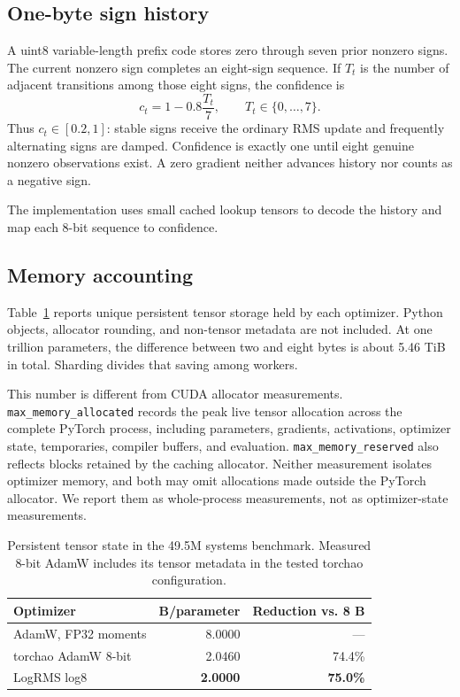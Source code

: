 \documentclass[10pt,twocolumn]{article}
\begin{document}
\subsection{One-byte sign history}

A uint8 variable-length prefix code stores zero through seven prior nonzero
signs. The current nonzero sign completes an eight-sign sequence. If $T_t$ is
the number of adjacent transitions among those eight signs, the confidence is
\begin{equation}
c_t = 1 - 0.8\frac{T_t}{7}, \qquad T_t\in\{0,\ldots,7\}.
\end{equation}
Thus $c_t\in[0.2,1]$: stable signs receive the ordinary RMS update and frequently
alternating signs are damped. Confidence is exactly one until eight genuine
nonzero observations exist. A zero gradient neither advances history nor counts
as a negative sign.

The implementation uses small cached lookup tensors to decode the history and
map each 8-bit sequence to confidence.

\subsection{Memory accounting}

Table~\ref{tab:payload} reports unique persistent tensor storage held by each
optimizer. Python objects, allocator rounding, and non-tensor metadata are not
included. At one trillion parameters, the difference between two and eight
bytes is about 5.46 TiB in total. Sharding divides that saving among workers.

This number is different from CUDA allocator measurements.
\texttt{max\_memory\_allocated} records the peak live tensor allocation across
the complete PyTorch process, including parameters, gradients, activations,
optimizer state, temporaries, compiler buffers, and evaluation.
\texttt{max\_memory\_reserved} also reflects blocks retained by the
caching allocator. Neither measurement isolates optimizer memory, and both may
omit allocations made outside the PyTorch allocator. We report them as
whole-process measurements, not as optimizer-state measurements.

\begin{table}[t]
\centering
\caption{Persistent tensor state in the 49.5M systems benchmark. Measured
8-bit AdamW includes its tensor metadata in the tested torchao configuration.}
\label{tab:payload}
\footnotesize
\begin{tabular}{@{}lrr@{}}
\toprule
Optimizer & B/parameter & Reduction vs. 8 B \\
\midrule
AdamW, FP32 moments & 8.0000 & --- \\
torchao AdamW 8-bit & 2.0460 & 74.4\% \\
LogRMS log8 & \textbf{2.0000} & \textbf{75.0\%} \\
\bottomrule
\end{tabular}
\end{table}
\end{document}
